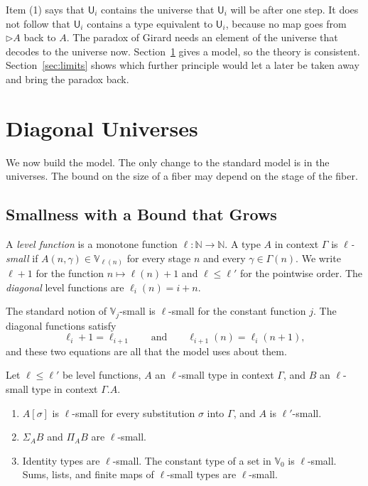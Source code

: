 \documentclass[acmsmall,nonacm,screen]{acmart}
\newcommand{\later}{{\triangleright}}
\newcommand{\Uv}{\mathsf{U}}
\newcommand{\Vg}{\mathbb{V}}
\begin{document}
\begin{remark}\label{rem:not-tt}
Item (1) says that $\Uv_i$ contains the universe that $\Uv_i$ will be after one step. It
does not follow that $\Uv_i$ contains a type equivalent to $\Uv_i$, because no map goes from
$\later A$ back to $A$. The paradox of Girard needs an element of the universe that decodes
to the universe now. Section~\ref{sec:model} gives a model, so the theory is consistent.
Section~\ref{sec:limits} shows which further principle would let a later be taken away and
bring the paradox back.
\end{remark}

\section{Diagonal Universes}\label{sec:model}

We now build the model. The only change to the standard model is in the universes. The
bound on the size of a fiber may depend on the stage of the fiber.

\subsection{Smallness with a Bound that Grows}

\begin{definition}
A \emph{level function} is a monotone function $\ell : \mathbb{N} \to \mathbb{N}$. A type
$A$ in context $\Gamma$ is \emph{$\ell$-small} if $A(n,\gamma) \in \Vg_{\ell(n)}$ for every
stage $n$ and every $\gamma \in \Gamma(n)$. We write $\ell + 1$ for the function
$n \mapsto \ell(n)+1$ and $\ell \le \ell'$ for the pointwise order. The \emph{diagonal} level
functions are $\ell_i(n) = i + n$.
\end{definition}

The standard notion of $\Vg_j$-small is $\ell$-small for the constant function $j$. The
diagonal functions satisfy
\begin{equation}\label{eq:diag}
  \ell_i + 1 = \ell_{i+1} \qquad\text{and}\qquad \ell_{i+1}(n) = \ell_i(n+1),
\end{equation}
and these two equations are all that the model uses about them.

\begin{lemma}[Closure]\label{lem:closure}
Let $\ell \le \ell'$ be level functions, $A$ an $\ell$-small type in context $\Gamma$, and
$B$ an $\ell$-small type in context $\Gamma.A$.
\begin{enumerate}
\item $A[\sigma]$ is $\ell$-small for every substitution $\sigma$ into $\Gamma$, and $A$ is
  $\ell'$-small.
\item $\Sigma_A B$ and $\Pi_A B$ are $\ell$-small.
\item Identity types are $\ell$-small. The constant type of a set in $\Vg_0$ is
  $\ell$-small. Sums, lists, and finite maps of $\ell$-small types are $\ell$-small.
\end{enumerate}
\end{lemma}
\end{document}
